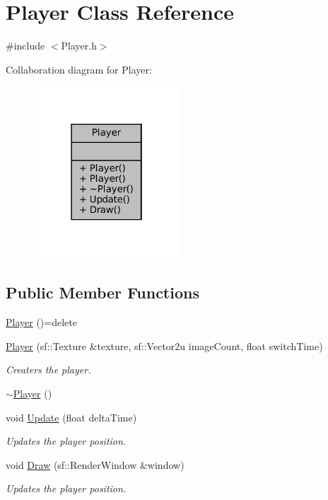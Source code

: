 \hypertarget{classPlayer}{}\section{Player Class Reference}
\label{classPlayer}


{\ttfamily \#include $<$Player.\+h$>$}



Collaboration diagram for Player\+:\nopagebreak
\begin{figure}[H]
\begin{center}
\leavevmode
\includegraphics[width=154pt]{classPlayer__coll__graph}
\end{center}
\end{figure}
\subsection*{Public Member Functions}
\begin{DoxyCompactItemize}
\item 
\mbox{\hyperlink{classPlayer_a314e533783ad3c376a43cad3f49efa0c}{Player}} ()=delete
\item 
\mbox{\hyperlink{classPlayer_a033e19f2fd9948f3aad73cd82a404f8e}{Player}} (sf\+::\+Texture \&texture, sf\+::\+Vector2u image\+Count, float switch\+Time)
\begin{DoxyCompactList}\small\item\em Creaters the player. \end{DoxyCompactList}\item 
\mbox{\hyperlink{classPlayer_a749d2c00e1fe0f5c2746f7505a58c062}{$\sim$\+Player}} ()
\item 
void \mbox{\hyperlink{classPlayer_ae6b2acaf61aae4df8e10f50ebbdf664d}{Update}} (float delta\+Time)
\begin{DoxyCompactList}\small\item\em Updates the player position. \end{DoxyCompactList}\item 
void \mbox{\hyperlink{classPlayer_a6a0b48c845f9c341283b5fc5a7898f9b}{Draw}} (sf\+::\+Render\+Window \&window)
\begin{DoxyCompactList}\small\item\em Updates the player position. \end{DoxyCompactList}\end{DoxyCompactItemize}
